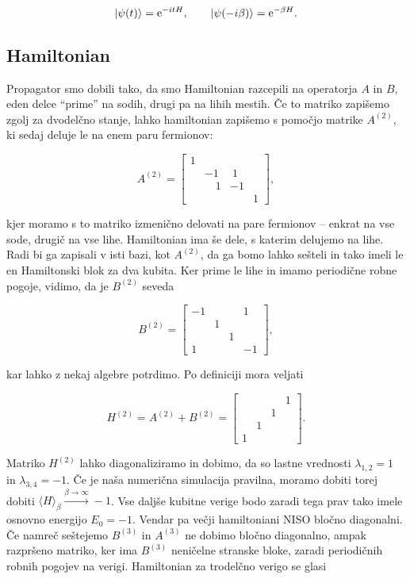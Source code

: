 \documentclass[a4 paper, 12pt]{article}
\begin{document}
\[
	|\psi(t)\rangle = \text{e}^{-itH}, \qquad |\psi(-i\beta)\rangle = \text{e}^{-\beta H}.
\]

\subsection{Hamiltonian}

Propagator smo dobili tako, da smo Hamiltonian razcepili na operatorja $A$ in $B$, eden delce "`prime"' na sodih,
drugi pa na lihih mestih. Če to matriko zapišemo zgolj za dvodelčno stanje, lahko hamiltonian zapišemo s pomočjo
matrike $A^{(2)}$, ki sedaj deluje le na enem paru fermionov:

\[
	A^{(2)} = \begin{bmatrix}
		1 &  &  &  \\
		&-1 &\ 1 &  \\
		 & \quad 1 & -1 &  \\
		 &  &  & 1
		\end{bmatrix},
\]

kjer moramo s to matriko izmenično delovati na pare fermionov -- enkrat na vse sode, drugič na vse lihe. Hamiltonian
ima še dele, s katerim delujemo na lihe. Radi bi ga zapisali v isti bazi, kot $A^{(2)}$, da ga bomo lahko sešteli
in tako imeli le en Hamiltonski blok za dva kubita. Ker prime le lihe in imamo periodične robne pogoje, vidimo, da je
$B^{(2)}$ seveda

\[
	B^{(2)} = \begin{bmatrix}
		-1 & & & 1 \\
		& 1 & & \\
		& & 1 & \\
		1 & & & -1
		\end{bmatrix},
\]

kar lahko z nekaj algebre potrdimo. Po definiciji mora veljati

\begin{equation}
	H^{(2)} = A^{(2)} + B^{(2)} = \begin{bmatrix}
		& & & 1 \\
		& & 1 & \\
		& 1 & & \\
		1 & & &
		\end{bmatrix}.
\end{equation}

Matriko $H^{(2)}$ lahko diagonaliziramo in dobimo, da so lastne vrednosti $\lambda_{1,2} = 1$ in $\lambda_{3,4} = -1$.
Če je naša numerična simulacija pravilna, moramo dobiti torej dobiti $\langle H \rangle_\beta
\stackrel{\beta \to \infty}{\longrightarrow} -1$. Vse daljše kubitne verige bodo zaradi tega prav tako imele osnovno
energijo $E_0 = -1$. Vendar pa večji hamiltoniani NISO bločno diagonalni. Če namreč seštejemo $B^{(3)}$ in $A^{(3)}$ ne
dobimo bločno diagonalno, ampak razpršeno matriko, ker ima $B^{(3)}$ neničelne stranske bloke, zaradi periodičnih robnih
pogojev na verigi. Hamiltonian za trodelčno verigo se glasi
\end{document}
